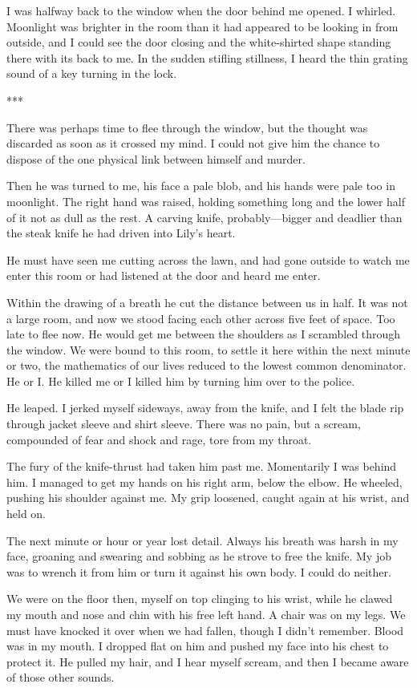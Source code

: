 \documentclass{novel}
\begin{document}
{I was halfway back to the window when the door behind me opened. I whirled. Moonlight was brighter in the room than it had appeared to be looking in from outside, and I could see the door closing and the white-shirted shape standing there with its back to me. In the sudden stifling stillness, I heard the thin grating sound of a key turning in the lock.

***

There was perhaps time to flee through the window, but the thought was discarded as soon as it crossed my mind. I could not give him the chance to dispose of the one physical link between himself and murder.

Then he was turned to me, his face a pale blob, and his hands were pale too in moonlight. The right hand was raised, holding something long and the lower half of it not as dull as the rest. A carving knife, probably—bigger and deadlier than the steak knife he had driven into Lily’s heart.

He must have seen me cutting across the lawn, and had gone outside to watch me enter this room or had listened at the door and heard me enter.

Within the drawing of a breath he cut the distance between us in half. It was not a large room, and now we stood facing each other across five feet of space. Too late to flee now. He would get me between the shoulders as I scrambled through the window. We were bound to this room, to settle it here within the next minute or two, the mathematics of our lives reduced to the lowest common denominator. He or I. He killed me or I killed him by turning him over to the police.

He leaped. I jerked myself sideways, away from the knife, and I felt the blade rip through jacket sleeve and shirt sleeve. There was no pain, but a scream, compounded of fear and shock and rage, tore from my throat.

The fury of the knife-thrust had taken him past me. Momentarily I was behind him. I managed to get my hands on his right arm, below the elbow. He wheeled, pushing his shoulder against me. My grip loosened, caught again at his wrist, and held on.

The next minute or hour or year lost detail. Always his breath was harsh in my face, groaning and swearing and sobbing as he strove to free the knife. My job was to wrench it from him or turn it against his own body. I could do neither.

We were on the floor then, myself on top clinging to his wrist, while he clawed my mouth and nose and chin with his free left hand. A chair was on my legs. We must have knocked it over when we had fallen, though I didn’t remember. Blood was in my mouth. I dropped flat on him and pushed my face into his chest to protect it. He pulled my hair, and I hear myself scream, and then I became aware of those other sounds.

}
\end{document}
